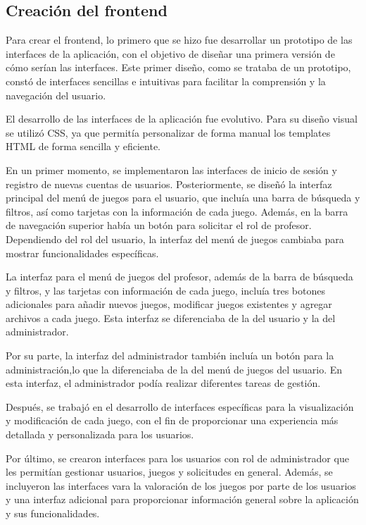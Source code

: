 \subsection{Creación del frontend}
Para crear el frontend, lo primero que se hizo fue desarrollar un prototipo de las interfaces de la aplicación, con el objetivo de diseñar una primera versión de cómo serían las interfaces. Este primer diseño, como se trataba de un prototipo, constó de interfaces sencillas e intuitivas para facilitar la comprensión y la navegación del usuario.

El desarrollo de las interfaces de la aplicación fue evolutivo. Para su diseño visual se utilizó CSS, ya que permitía personalizar de forma manual los templates HTML de forma sencilla y eficiente.

En un primer momento, se implementaron las interfaces de inicio de sesión y registro de nuevas cuentas de usuarios. Posteriormente, se diseñó la interfaz principal del menú de juegos para el usuario, que incluía una barra de búsqueda y filtros, así como tarjetas con la información de cada juego. Además, en la barra de navegación superior había un botón para solicitar el rol de profesor. Dependiendo del rol del usuario, la interfaz del menú de juegos cambiaba para mostrar funcionalidades específicas.

La interfaz para el menú de juegos del profesor, además de la barra de búsqueda y filtros, y las tarjetas con información de cada juego, incluía tres botones adicionales para añadir nuevos juegos, modificar juegos existentes y agregar archivos a cada juego. Esta interfaz se diferenciaba de la del usuario y la del administrador.

Por su parte, la interfaz del administrador también incluía un botón para la administración,lo que la diferenciaba de la del menú de juegos del usuario. En esta interfaz, el administrador podía realizar diferentes tareas de gestión.

Después, se trabajó en el desarrollo de interfaces específicas para la visualización y modificación de cada juego, con el fin de proporcionar una experiencia más detallada y personalizada para los usuarios.

Por último, se crearon interfaces para los usuarios con rol de administrador que les permitían gestionar usuarios, juegos y solicitudes en general. Además, se incluyeron las interfaces vara la valoración de los juegos por parte de los usuarios y una interfaz adicional para proporcionar información general sobre la aplicación y sus funcionalidades.

